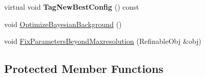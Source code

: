 \begin{DoxyCompactItemize}
\item 
\mbox{\label{class_obj_cryst_1_1_powder_pattern_background_a24eccd49871bb628f2c32a2a0f98c67a}} 
virtual void {\bfseries Tag\+New\+Best\+Config} () const
\item 
void \mbox{\hyperlink{class_obj_cryst_1_1_powder_pattern_background_a0735ae2350ebce9320ebc2fd16dd94be}{Optimize\+Bayesian\+Background}} ()
\item 
void \mbox{\hyperlink{class_obj_cryst_1_1_powder_pattern_background_a874e0bed05f17df53ad6ddd3df989dc9}{Fix\+Parameters\+Beyond\+Maxresolution}} (Refinable\+Obj \&obj)
\end{DoxyCompactItemize}
\subsection*{Protected Member Functions}
